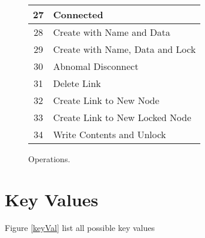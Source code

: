 \begin{figure}[htpb]
\begin{center}
\begin{tabular} {|c|l|}
      27 & Connected \\ \hline
      28 & Create with Name and Data \\ \hline
      29 & Create with Name, Data and Lock \\ \hline
      30 & Abnomal Disconnect \\ \hline
      31 & Delete Link \\ \hline
      32 & Create Link to New Node \\ \hline
      33 & Create Link to New Locked Node \\ \hline
      34 & Write Contents and Unlock \\ \hline
    \end{tabular}
  \end{center}
  \caption{\label{ops}Operations. }
\end{figure}
\normalsize

\section{Key Values}

Figure \ref{keyVal} list all possible key values
\small

